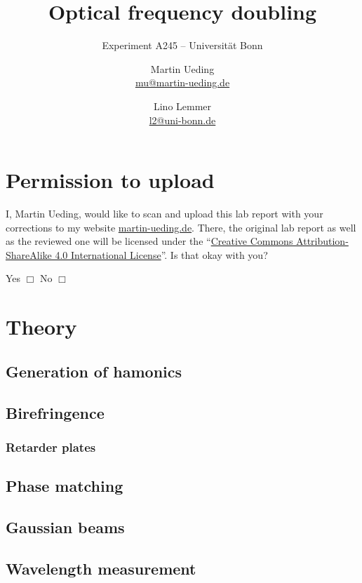 \documentclass[11pt, english, fleqn, DIV=15, headinclude, BCOR=2cm]{scrreprt}
\title{Optical frequency doubling}
\subtitle{Experiment A245 -- Universität Bonn}
\author{%
    Martin Ueding \\
    \small{\href{mailto:mu@martin-ueding.de}{mu@martin-ueding.de}}
    \and
    Lino Lemmer \\
    \small{\href{mailto:l2@uni-bonn.de}{l2@uni-bonn.de}}
}
\date{\daterange{2016-05-23}{2016-05-24}}
\begin{document}
\maketitle

\begin{abstract}
\end{abstract}

\tableofcontents

\chapter*{Permission to upload}

I, Martin Ueding, would like to scan and upload this lab report with your
corrections to my website \href{http://martin-ueding.de}{martin-ueding.de}.
There, the original lab report as well as the reviewed one will be licensed
under the “\href{http://creativecommons.org/licenses/by-sa/4.0/}{Creative
Commons Attribution-ShareAlike 4.0 International License}”. Is that okay with
you?

Yes $\Box$ \hspace{2cm} No $\Box$

\chapter{Theory}


\section{Generation of hamonics}

\section{Birefringence}

\subsection{Retarder plates}

\section{Phase matching}

\section{Gaussian beams}

\section{Wavelength measurement}
\end{document}
